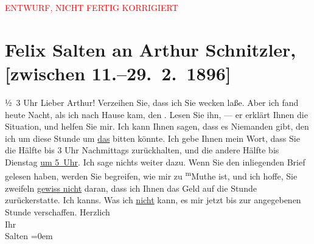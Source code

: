 
\begin{center}
            \textcolor{red}{ENTWURF, NICHT FERTIG KORRIGIERT}
                      \end{center}
            
         \renewcommand{\erwaehnteOrte}{Orte: Wien}
         \renewcommand{\erwaehnteWerke}{}
               \section[Felix Salten an Arthur Schnitzler, {[}zwischen 11.–29. 2. 1896{]}]{ Felix Salten an Arthur Schnitzler, {[}zwischen 11.–29. 2. 1896{]}}\nopagebreak{}\rehead{ }\begin{ledgroupsized}[t]{13cm}\normalsize\beginnumbering \toendnotes[C]{\smallbreak\pagebreak[2]} 
\toendnotes[C]{\smallbreak}\pstart
           \raggedleft{}{\pb}½ 3
                  Uhr\pend
           \pstart
           Lieber Arthur! Verzeihen Sie, dass ich Sie wecken laße. Aber ich
               fand heute Nacht, als ich nach Hause kam, den \label{K_L03168-1v}\label{K_L03168-1h}. Lesen Sie ihn, — er erklärt Ihnen die Situation,
               und helfen Sie mir. Ich kann Ihnen sagen, dass es Niemanden gibt, den ich um diese
               Stunde um \uline{das} bitten könnte. Ich gebe Ihnen mein
               Wort, dass Sie die Hälfte bis 3 Uhr Nachmittags zurückhalten, und die andere Hälfte
               bis Dienstag {\pb}\uline{um 5 Uhr}. Ich sage nichts weiter dazu. Wenn Sie
               den inliegenden Brief gelesen haben, werden Sie begreifen, wie mir zu \substVorne{}\textsuperscript{m}\substDazwischen{}M\substHinten{}uthe ist, und ich hoffe, Sie zweifeln \uline{gewiss
                  nicht} daran, dass ich Ihnen das Geld auf die Stunde zurückerstatte. Ich
               kanns. Was ich \uline{nicht} kann, es mir jetzt bis zur
               angegebenen Stunde verschaffen.\pend
           \pstart
           Herzlich{\\[\baselineskip]}Ihr{\\[\baselineskip]}\spacefill\mbox{Salten}\pend
           \leftskip=0em{}
         
         \endnumbering{}\end{ledgroupsized}\begin{anhang}\end{anhang}\newcommand{\dateiname}{L03168}\newcommand{\titel}{Felix Salten an Arthur Schnitzler, [zwischen 11.–29. 2. 1896]}\newcommand{\editorInnen}{Martin Anton Müller und Laura Untner}
      